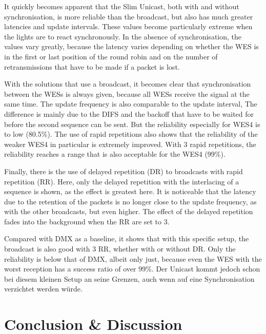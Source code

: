 It quickly becomes apparent that the Slim Unicast, both with and without synchronisation, 
is more reliable than the broadcast, but also has much greater latencies and update intervals.
These values become particularly extreme when the lights are to react synchronously.
In the absence of synchronisation, the values vary greatly, 
because the latency varies depending on whether the WES is in the first or last position of the round robin
and on the number of retransmissions that have to be made if a packet is lost.

With the solutions that use a broadcast, it becomes clear that synchronisation between the WESs is always given,
because all WESs receive the signal at the same time.
The update frequency is also comparable to the update interval,
The difference is mainly due to the DIFS and the backoff that have to be waited for before the second sequence can be sent.
But the reliability especially for WES4 is to low (80.5\%).
The use of rapid repetitions also shows that the reliability of the weaker WES4 in particular is extremely improved.
With 3 rapid repetitions, the reliability reaches a range that is also acceptable for the WES4 (99\%).

Finally, there is the use of delayed repetition (DR) to broadcasts with rapid repetition (RR).
Here, only the delayed repetition with the interlacing of a sequence is shown,
as the effect is greatest here.
It is noticeable that the latency due to the retention of the packets is no longer close to the update frequency, 
as with the other broadcasts, but even higher.
The effect of the delayed repetition fades into the background when the RR are set to 3.

Compared with DMX as a baseline, it shows that with this specific setup,
the broadcast is also good with 3 RR, whether with or without DR.
Only the reliability is below that of DMX, albeit only just,
because even the WES with the worst reception has a success ratio of over 99\%.
Der Unicast kommt jedoch schon bei diesem kleinen Setup an seine Grenzen,
auch wenn auf eine Synchronisation verzichtet werden würde.

\chapter{Conclusion \& Discussion}

